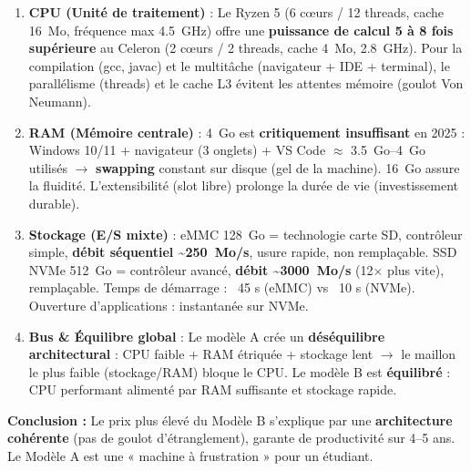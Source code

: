 \documentclass[11pt]{article}
\newcounter{popsec}
\newcounter{popsub}
\newcommand{\courssub}[1]{%
  \stepcounter{popsub}%
  \par\vspace{9pt}\noindent{\popxbold\fontsize{11.5}{13}\selectfont\color{popink}{\color{poporange}\thepopsec.\thepopsub}\hspace{6pt}#1}\par\nopagebreak\vspace{4pt}
}
\begin{document}
\begin{exoresolu}
\begin{enumerate}
    \item \textbf{CPU (Unité de traitement)} : Le Ryzen 5 (6 cœurs / 12 threads, cache \SI{16}{Mo}, fréquence max \SI{4.5}{\giga\hertz}) offre une \textbf{puissance de calcul 5 à 8 fois supérieure} au Celeron (2 cœurs / 2 threads, cache \SI{4}{Mo}, \SI{2.8}{\giga\hertz}). Pour la compilation (gcc, javac) et le multitâche (navigateur + IDE + terminal), le parallélisme (threads) et le cache L3 évitent les attentes mémoire (goulot Von Neumann).
    \item \textbf{RAM (Mémoire centrale)} : \SI{4}{Go} est \textbf{critiquement insuffisant} en 2025 : Windows 10/11 + navigateur (3 onglets) + VS Code $\approx$ \SI{3.5}{Go}--\SI{4}{Go} utilisés $\rightarrow$ \textbf{swapping} constant sur disque (gel de la machine). \SI{16}{Go} assure la fluidité. L'extensibilité (slot libre) prolonge la durée de vie (investissement durable).
    \item \textbf{Stockage (E/S mixte)} : eMMC \SI{128}{Go} = technologie carte SD, contrôleur simple, \textbf{débit séquentiel \SI{~250}{Mo/s}}, usure rapide, non remplaçable. SSD NVMe \SI{512}{Go} = contrôleur avancé, \textbf{débit \SI{~3000}{Mo/s}} (12$\times$ plus vite), remplaçable. Temps de démarrage : ~45 s (eMMC) vs ~10 s (NVMe). Ouverture d'applications : instantanée sur NVMe.
    \item \textbf{Bus \& Équilibre global} : Le modèle A crée un \textbf{déséquilibre architectural} : CPU faible + RAM étriquée + stockage lent $\rightarrow$ le maillon le plus faible (stockage/RAM) bloque le CPU. Le modèle B est \textbf{équilibré} : CPU performant alimenté par RAM suffisante et stockage rapide.
\end{enumerate}

\textbf{Conclusion :} Le prix plus élevé du Modèle B s'explique par une \textbf{architecture cohérente} (pas de goulot d'étranglement), garante de productivité sur 4--5 ans. Le Modèle A est une « machine à frustration » pour un étudiant.
\end{exoresolu}

\courssub{Synthèse de la section}
\end{document}
